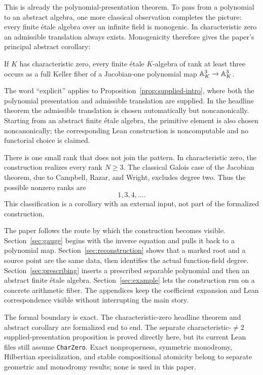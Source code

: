 This is already the polynomial-presentation theorem.  To pass from a
polynomial to an abstract algebra, one more classical observation completes
the picture: every finite \'etale algebra over an infinite field is
monogenic.  In characteristic zero an admissible translation always exists.
Monogenicity therefore gives the paper's principal abstract corollary:

\begin{corollary}\label{cor:main-intro}
If \(K\) has characteristic zero, every finite \'etale \(K\)-algebra of rank
at least three occurs as a full Keller fiber of a Jacobian-one polynomial
map \(\mathbb A^3_K\to\mathbb A^3_K\).
\end{corollary}

The word ``explicit'' applies to
Proposition~\ref{prop:supplied-intro}, where both the polynomial presentation
and admissible translation are supplied.  In the headline theorem the
admissible translation is chosen automatically but noncanonically.  Starting
from an abstract finite \'etale algebra, the primitive element is also chosen
noncanonically; the corresponding Lean construction is noncomputable and no
functorial choice is claimed.

There is one small rank that does not join the pattern.  In characteristic
zero, the construction realizes every rank \(N\geq3\).  The classical
Galois case of the Jacobian theorem, due to Campbell, Razar, and Wright,
excludes degree two.  Thus the possible nonzero ranks are
\[
 1,3,4,\ldots.
\]
This classification is a corollary with an external input, not part of the
formalized construction.

The paper follows the route by which the construction becomes visible.
Section~\ref{sec:gauge} begins with the inverse equation and pulls it back to
a polynomial map.  Section~\ref{sec:reconstruction} shows that a marked root
and a source point are the same data, then identifies the actual
function-field degree.  Section~\ref{sec:prescribing} inserts a prescribed
separable polynomial and then an abstract finite \'etale algebra.
Section~\ref{sec:example} lets the construction run on a concrete arithmetic
fiber.  The appendices keep the coefficient expansion and Lean
correspondence visible without interrupting the main story.

The formal boundary is exact.  The characteristic-zero headline theorem and
abstract corollary are formalized end to end.  The separate
characteristic-\(\ne2\) supplied-presentation proposition is proved directly
here, but its current Lean files still assume \texttt{CharZero}.  Exact
nonproperness, symmetric monodromy, Hilbertian specialization, and stable
compositional atomicity belong to separate geometric and monodromy results;
none is used in this paper.
